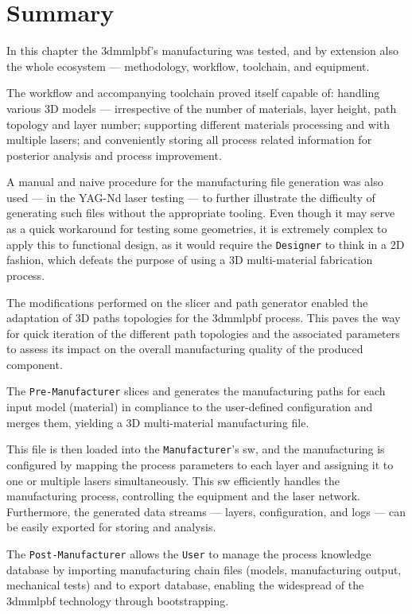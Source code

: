 \section{Summary}
In this chapter the \gls{3dmmlpbf}'s manufacturing was tested, and by extension
also the whole ecosystem --- methodology, workflow, toolchain, and equipment.

The workflow and accompanying toolchain proved itself capable of: handling various 3D models ---
irrespective of the number of materials, layer height, path topology and layer
number; supporting different materials processing and with multiple lasers; and
conveniently storing all process related information for posterior analysis and
process improvement.

A manual and naive procedure for the manufacturing file generation was also used
--- in the YAG-Nd laser testing ---
to further illustrate the difficulty of generating such files without the
appropriate tooling. Even though it may serve as a quick workaround for testing
some geometries, it is extremely complex to apply this to functional design, as
it would require the \texttt{Designer} to think in a 2D fashion, which defeats
the purpose of using a 3D multi-material fabrication process.

The modifications performed on the slicer and path generator enabled the 
adaptation of 3D paths topologies for the \gls{3dmmlpbf} process. This paves the
way for quick iteration of the different path topologies and the associated
parameters to assess its impact on the overall manufacturing quality of the
produced component.

The \texttt{Pre-Manufacturer} slices and generates the manufacturing paths for each input
model (material) in compliance to the user-defined configuration and merges
them, yielding a 3D multi-material manufacturing file.

This file is then loaded into the \texttt{Manufacturer}'s \gls{sw},
and the manufacturing is configured by mapping the process parameters to each
layer and assigning it to one or multiple lasers simultaneously. This \gls{sw}
efficiently handles the manufacturing process, controlling the equipment and the laser network.
Furthermore, the generated data streams ---
layers, configuration, and logs --- can be easily exported for storing and analysis.

The \texttt{Post-Manufacturer}
allows the \texttt{User} to manage the process knowledge database by importing
manufacturing chain files (models, manufacturing output, mechanical tests) and to export database,
enabling the widespread of the \gls{3dmmlpbf} technology through bootstrapping.


